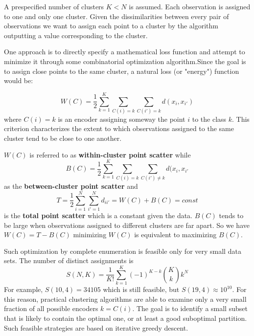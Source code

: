 A prespecified number of clusters $K<N$ is assumed.  Each observation is assigned to one and only one cluster. Given the dissimilarities between every pair of observations we want to assign each point to a cluster by the algorithm outputting a value corresponding to the cluster.

One approach is to directly specify a mathematical loss function and attempt to minimize it through some combinatorial optimization algorithm.Since the goal is to assign close points to the same cluster, a natural loss (or "energy") function would be:

\begin{equation}
W(C)  = \frac{1}{2}\sum_{k=1}^K \sum_{C(i) = k} \sum_{C(i') = k} d(x_i, x_{i'})
\end{equation}
where $C(i) = k$ is an encoder assigning someway the point $i$ to the class $k$.
This criterion characterizes the extent to which observations assigned to the same cluster tend to be close to one another.

$W(C)$ is referred to as \textbf{within-cluster point scatter} while 
\begin{equation}
B(C) =\frac{1}{2} \sum_{k=1}^K \sum_{C(i) = k} \sum_{C(i') \ne k} d(x_i, x_{i'}
\end{equation}
as the \textbf{between-cluster point scatter} and
\begin{equation}
T = \frac{1}{2} \sum_{i=1}^N \sum_{i'=1}^N d_{ii'} = W(C) + B(C) = const
\end{equation}
is the \textbf{total point scatter} which is a constant given the data. $B(C)$ tends to be large when observations assigned to different clusters are far apart.
So we have $W(C) = T - B(C) $ minimizing $W(C)$ is equivalent to maximizing $B(C)$.

Such optimization by complete enumeration is feasible only for very small data sets. The number of distinct assignments is
\begin{equation}
S(N,K) = \frac{1}{K!} \sum_{k=1}^K (-1)^{K-k} \binom{K}{k} k^N
\end{equation}
For example, $S(10, 4) = 34105$ which is still feasible, but $S(19,4) \approx 10^{10}$.  For this reason, practical clustering algorithms are able to examine only a very small fraction of all possible encoders $k = C(i)$. The goal is to identify a small subset that is likely to contain the optimal one, or at least a good suboptimal partition. Such feasible strategies are based on iterative greedy descent.


